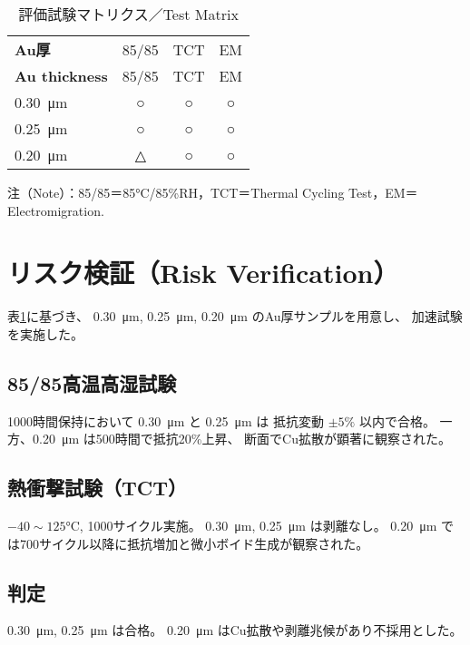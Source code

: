 \documentclass[onecolumn]{IEEEtran} %
\begin{document}
\begin{table}[htbp]
  \centering
  \caption{評価試験マトリクス／Test Matrix}
  \label{tab:test-matrix}
  \begin{tabular}{@{}lccc@{}}
    \toprule
    \textbf{Au厚} & 85/85 & TCT & EM \\
    \textbf{Au thickness} & 85/85 & TCT & EM \\
    \midrule
    \SI{0.30}{\micro\meter} & ○ & ○ & ○ \\
    \SI{0.25}{\micro\meter} & ○ & ○ & ○ \\
    \SI{0.20}{\micro\meter} & △ & ○ & ○ \\
    \bottomrule
  \end{tabular}
  \vspace{2pt}
  \footnotesize{注（Note）：85/85＝85\si{\celsius}/85\%RH，TCT＝Thermal Cycling Test，EM＝Electromigration.}
\end{table}

\section{リスク検証（Risk Verification）}

表\ref{tab:test-matrix}に基づき、
\SI{0.30}{\micro\meter}, \SI{0.25}{\micro\meter}, \SI{0.20}{\micro\meter} のAu厚サンプルを用意し、
加速試験を実施した。

\subsection*{85/85高温高湿試験}
1000時間保持において \SI{0.30}{\micro\meter} と \SI{0.25}{\micro\meter} は
抵抗変動 $\pm5\%$ 以内で合格。
一方、\SI{0.20}{\micro\meter} は500時間で抵抗20\%上昇、
断面でCu拡散が顕著に観察された。

\subsection*{熱衝撃試験（TCT）}
$-40 \sim 125$\si{\celsius}, 1000サイクル実施。
\SI{0.30}{\micro\meter}, \SI{0.25}{\micro\meter} は剥離なし。
\SI{0.20}{\micro\meter} では700サイクル以降に抵抗増加と微小ボイド生成が観察された。

\subsection*{判定}
\SI{0.30}{\micro\meter}, \SI{0.25}{\micro\meter} は合格。
\SI{0.20}{\micro\meter} はCu拡散や剥離兆候があり不採用とした。
\end{document}
